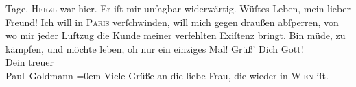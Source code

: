\begin{ledgroupsized}[t]{13cm}
               Tage.\pend
           \pstart
           \textsc{Herzl} war hier. Er iſt mir unſagbar widerwärtig.\pend
           \pstart
           Wüſtes Leben, mein lieber Freund! Ich will in \textsc{Paris} verſchwinden, will mich gegen draußen abſperren, von wo mir jeder Luftzug die
               Kunde meiner {\pb}verfehlten Exiſtenz bringt. Bin müde,
               zu kämpfen, und möchte leben, oh nur ein einziges Mal!\pend
           \pstart
           Grüß’ Dich Gott! {\\[\baselineskip]}Dein treuer {\\[\baselineskip]}\spacefill\mbox{Paul Goldmann}\pend
           \leftskip=0em{}\pstart
           \noindent{}Viele Grüße an die liebe Frau, die wieder in \textsc{Wien} iſt.\pend
           
         
         \endnumbering{}\end{ledgroupsized}  \newcommand{\dateiname}{L02757}\newcommand{\titel}{Paul Goldmann an Arthur Schnitzler, 29. 11. [1895]}\newcommand{\editorInnen}{Martin Anton Müller und Laura Untner}
      